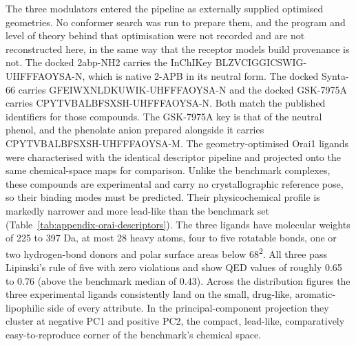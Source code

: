 The three modulators entered the pipeline as externally supplied optimised geometries. No conformer search was run to prepare them, and the program and level of theory behind that optimisation were not recorded and are not reconstructed here, in the same way that the receptor model\textquotesingle s build provenance is not. The docked 2abp-NH2 carries the InChIKey BLZVCIGGICSWIG-UHFFFAOYSA-N, which is native 2-APB in its neutral form. The docked Synta-66 carries GFEIWXNLDKUWIK-UHFFFAOYSA-N and the docked GSK-7975A carries CPYTVBALBFSXSH-UHFFFAOYSA-N. Both match the published identifiers for those compounds. The GSK-7975A key is that of the neutral phenol, and the phenolate anion prepared alongside it carries CPYTVBALBFSXSH-UHFFFAOYSA-M. The geometry-optimised Orai1 ligands were characterised with the identical descriptor pipeline and projected onto the same chemical-space maps for comparison. Unlike the benchmark complexes, these compounds are experimental and carry no crystallographic reference pose, so their binding modes must be predicted. Their physicochemical profile is markedly narrower and more lead-like than the benchmark set (Table~\ref{tab:appendix-orai-descriptors}). The three ligands have molecular weights of 225 to 397 Da, at most 28 heavy atoms, four to five rotatable bonds, one or two hydrogen-bond donors and polar surface areas below 68\angstrom{}\textsuperscript{2}. All three pass Lipinski's rule of five with zero violations and show QED values of roughly 0.65 to 0.76 (above the benchmark median of 0.43). Across the distribution figures the three experimental ligands consistently land on the small, drug-like, aromatic-lipophilic side of every attribute. In the principal-component projection they cluster at negative PC1 and positive PC2, the compact, lead-like, comparatively easy-to-reproduce corner of the benchmark's chemical space.

